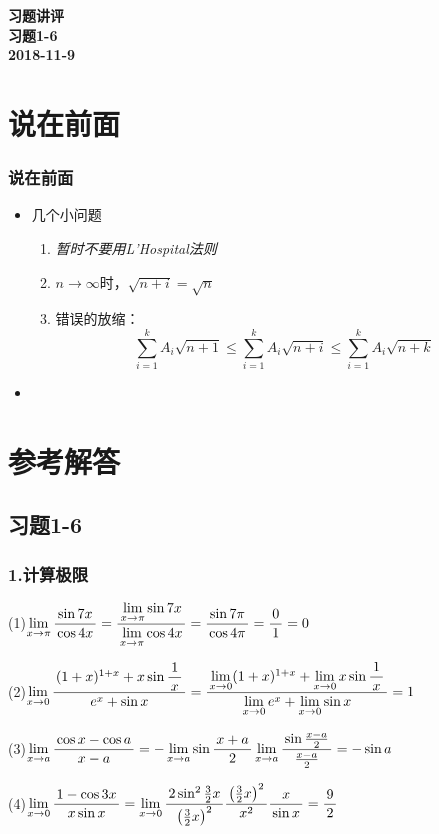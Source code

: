 
\begin{frame}
	\centering
	\bf\Huge\color{purple} 习题讲评\\[1em]
	\small 习题1-6\\[1cm]
	\small\color{gray}2018-11-9
\end{frame}

\section{说在前面}

\begin{frame}[t]\frametitle{说在前面}
	\linespread{1.8}
	\Large
	\vspace*{-1em}
    \begin{itemize}
    	\item 几个小问题
    	\begin{enumerate}
    		\item {\it 暂时不要用L'Hospital法则}
    		\item {\color{purple}$n\to\infty$时，$\sqrt{n+i}=\sqrt{n}$}
    		\item {\color{purple} 错误的放缩：
    			$$\sum\limits_{i=1}^kA_i\sqrt{n+1}
    			\leq\sum\limits_{i=1}^kA_i\sqrt{n+i}
    			\leq\sum\limits_{i=1}^kA_i\sqrt{n+k}$$
    		}
    	\end{enumerate}
    	\item {}
    \end{itemize}
\end{frame}

\section{参考解答}

\subsection{习题1-6}

\begin{frame}[t]\frametitle{1.计算极限}
\large
(1)$\limx{\pi}\df{\sin 7x}{\cos 4x}
=\df{\limx{\pi}\sin 7x}
	{\limx{\pi}\cos 4x}=\df{\sin7\pi}{\cos4\pi}=\df01=0$

\bs
(2)$\limx0\df{(1+x)^{1+x}+x\sin\df1x}{e^x+\sin x}
=\df{\limx0(1+x)^{1+x}+\limx0x\sin\df1x}
{\limx0e^x+\limx0\sin x}=1$

\bs
(3)$\limx{a}\df{\cos x-\cos a}{x-a}
=-\limx a\sin\df{x+a}2
\limx a\df{\sin\frac{x-a}2}{\frac{x-a}2}=-\sin a$

\bs
(4)$\limx0\df{1-\cos3x}{x\sin x}
=\limx0\df{2\sin^2\frac32x}
{\left(\frac{3}{2}x\right)^2}\df{\left(\frac32x\right)^2}{x^2}
\df{x}{\sin x}=\df92$
\end{frame}

